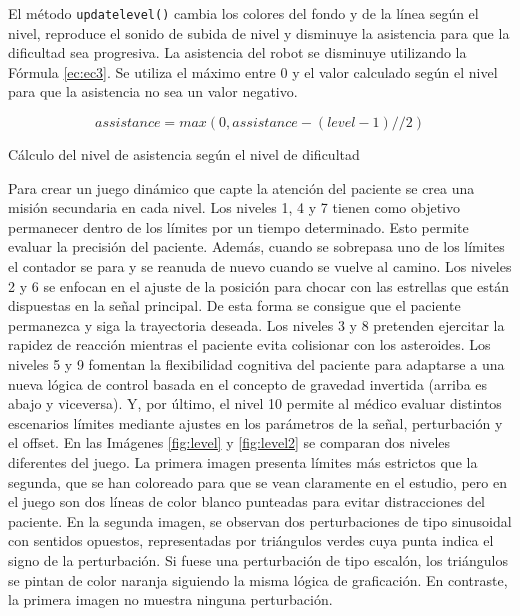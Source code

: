 El método \verb|updatelevel()| cambia los colores del fondo y de la línea según el nivel, reproduce el sonido de subida de nivel y disminuye la asistencia para que la dificultad sea progresiva.
La asistencia del robot se disminuye utilizando la Fórmula \ref{ec:ec3}.
Se utiliza el máximo entre 0 y el valor calculado según el nivel para que la asistencia no sea un valor negativo.

\begin{myequation}[h]
\begin{equation}
assistance = max(0, assistance - (level - 1) // 2)
\nonumber
\label{ec:ec3}
\end{equation}
\caption[Cálculo del nivel de asistencia según el nivel de dificultad]{Cálculo del nivel de asistencia según el nivel de dificultad}
\end{myequation}

Para crear un juego dinámico que capte la atención del paciente se crea una misión secundaria en cada nivel.
Los niveles 1, 4 y 7 tienen como objetivo permanecer dentro de los límites por un tiempo determinado.
Esto permite evaluar la precisión del paciente.
Además, cuando se sobrepasa uno de los límites el contador se para y se reanuda de nuevo cuando se vuelve al camino.
Los niveles 2 y 6 se enfocan en el ajuste de la posición para chocar con las estrellas que están dispuestas en la señal principal.
De esta forma se consigue que el paciente permanezca y siga la trayectoria deseada.
Los niveles 3 y 8 pretenden ejercitar la rapidez de reacción mientras el paciente evita colisionar con los asteroides.
Los niveles 5 y 9 fomentan la flexibilidad cognitiva del paciente para adaptarse a una nueva lógica de control basada en el concepto de gravedad invertida (arriba es abajo y viceversa).
Y, por último, el nivel 10 permite al médico evaluar distintos escenarios límites mediante ajustes en los parámetros de la señal, perturbación y el offset.
En las Imágenes \ref{fig:level} y \ref{fig:level2} se comparan dos niveles diferentes del juego.
La primera imagen presenta límites más estrictos que la segunda, que se han coloreado para que se vean claramente en el estudio, pero en el juego son dos líneas de color blanco punteadas para evitar distracciones del paciente.
En la segunda imagen, se observan dos perturbaciones de tipo sinusoidal con sentidos opuestos, representadas por triángulos verdes cuya punta indica el signo de la perturbación.
Si fuese una perturbación de tipo escalón, los triángulos se pintan de color naranja siguiendo la misma lógica de graficación.
En contraste, la primera imagen no muestra ninguna perturbación.

